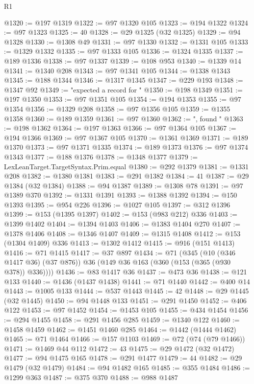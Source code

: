 \begin{lexlean}{R1}
\begin{coremodule}
@1320 := @197 @1319
@1322 := @97 @1320 @105
@1323 := @194 @1322
@1324 := @97 @1323
@1325 := 40
@1328 := @29 @1325 (@32 @1325)
@1329 := @94 @1328
@1330 := @1308 @49
@1331 := @97 @1330
@1332 := @1331 @105
@1333 := @1329 @1332
@1335 := @97 @1333 @105
@1336 := @1324 @1335
@1337 := @189 @1336
@1338 := @97 @1337
@1339 := @108 @953
@1340 := @1339 @14
@1341 := @1340 @208
@1343 := @97 @1341 @105
@1344 := @1338 @1343
@1345 := @188 @1344
@1346 := @1317 @1345
@1347 := @229 @193
@1348 := @1347 @92
@1349 := "expected a record for "
@1350 := @198 @1349
@1351 := @197 @1350
@1353 := @97 @1351 @105
@1354 := @194 @1353
@1355 := @97 @1354
@1356 := @1329 @208
@1358 := @97 @1356 @105
@1359 := @1355 @1358
@1360 := @189 @1359
@1361 := @97 @1360
@1362 := ", found "
@1363 := @198 @1362
@1364 := @197 @1363
@1366 := @97 @1364 @105
@1367 := @194 @1366
@1369 := @97 @1367 @105
@1370 := @1361 @1369
@1371 := @189 @1370
@1373 := @97 @1371 @1335
@1374 := @189 @1373
@1376 := @97 @1374 @1343
@1377 := @188 @1376
@1378 := @1348 @1377
@1379 := LexLeanTarget.TargetSyntax.Prim.equal
@1380 := @292 @1379
@1381 := @1331 @208
@1382 := @1380 @1381
@1383 := @291 @1382
@1384 := 41
@1387 := @29 @1384 (@32 @1384)
@1388 := @94 @1387
@1389 := @1308 @78
@1391 := @97 @1389 @370
@1392 := @1331 @1391
@1393 := @1388 @1392
@1394 := @150 @1393
@1395 := @954 @226
@1396 := @1027 @105
@1397 := @312 @1396
@1399 := @153 (@1395 @1397)
@1402 := @153 (@983 @212) @336
@1403 := @1399 @1402
@1404 := @1394 @1403
@1406 := @1383 @1404 @270
@1407 := @1378 @1406
@1408 := @1346 @1407
@1409 := @1315 @1408
@1412 := @153 (@1304 @1409) @336
@1413 := @1302 @1412
@1415 := @916 (@151 @1413)
@1416 := @71 @1415
@1417 := @37 @897
@1434 := @71
    (@345
      (@10 (@346 @1417 @36) (@37 @876))
      @36
      (@149 @36 @163 (@360 (@153 (@365 (@930 @378)) @336))))
@1436 := @83 @1417 @36
@1437 := @473 @36
@1438 := @121 @133
@1440 := @1436 (@1437 @1438)
@1441 := @71 @1440
@1442 := @400 @14
@1443 := @1005 @133
@1444 := @537 @1443
@1445 := 42
@1448 := @29 @1445 (@32 @1445)
@1450 := @94 @1448 @133
@1451 := @291 @1450
@1452 := @406 @122
@1453 := @97 @1452
@1454 := @1453 @105
@1455 := @434 @1454
@1456 := @294 @1455
@1458 := @291 @1456 @285
@1459 := @1340 @122
@1460 := @1458 @1459
@1462 := @1451 @1460 @285
@1464 := @1442 (@1444 @1462)
@1465 := @71 @1464
@1466 := @157 @1103
@1469 := @72 (@74 (@79 @1466))
@1471 := @1469 @44 @112
@1472 := 43
@1475 := @29 @1472 (@32 @1472)
@1477 := @94 @1475 @165
@1478 := @291 @1477
@1479 := 44
@1482 := @29 @1479 (@32 @1479)
@1484 := @94 @1482 @165
@1485 := @355 @1484
@1486 := @1299 @363
@1487 := @375 @370
@1488 := @988 @1487

\end{coremodule}
\end{lexlean}
